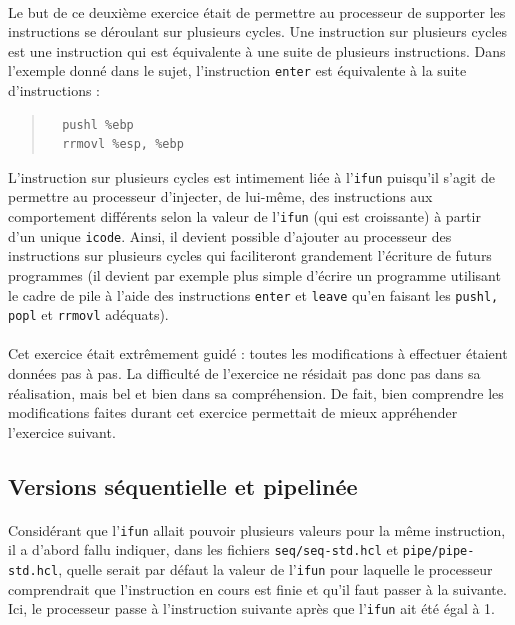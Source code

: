 \documentclass[12pt]{article}
\begin{document}
\paragraph{}Le but de ce deuxième exercice était de permettre au processeur de supporter les instructions se déroulant sur plusieurs cycles. Une instruction sur plusieurs cycles est une instruction qui est équivalente à une suite de plusieurs instructions. Dans l'exemple donné dans le sujet, l'instruction \verb+enter+ est équivalente à la suite d'instructions :
\begin{quote}
\begin{verbatim}
  pushl %ebp
  rrmovl %esp, %ebp
\end{verbatim}
\end{quote}
L'instruction sur plusieurs cycles est intimement liée à l'\verb+ifun+ puisqu'il s'agit de permettre au processeur d'injecter, de lui-même, des instructions aux comportement différents selon la valeur de l'\verb+ifun+ (qui est croissante) à partir d'un unique \verb+icode+. Ainsi, il devient possible d'ajouter au processeur des instructions sur plusieurs cycles qui faciliteront grandement l'écriture de futurs programmes (il devient par exemple plus simple d'écrire un programme utilisant le cadre de pile à l'aide des instructions \verb+enter+ et \verb+leave+ qu'en faisant les \verb+pushl, popl+ et \verb+rrmovl+ adéquats).

\paragraph{}Cet exercice était extrêmement guidé : toutes les modifications à effectuer étaient données pas à pas. La difficulté de l'exercice ne résidait pas donc pas dans sa réalisation, mais bel et bien dans sa compréhension. De fait, bien comprendre les modifications faites durant cet exercice permettait de mieux appréhender l'exercice suivant.

\subsection{Versions séquentielle et pipelinée}
\paragraph{}Considérant que l'\verb+ifun+ allait pouvoir plusieurs valeurs pour la même instruction, il a d'abord fallu indiquer, dans les fichiers \verb+seq/seq-std.hcl+ et \verb+pipe/pipe-std.hcl+, quelle serait par défaut la valeur de l'\verb+ifun+ pour laquelle le processeur comprendrait que l'instruction en cours est finie et qu'il faut passer à la suivante. Ici, le processeur passe à l'instruction suivante après que l'\verb+ifun+ ait été égal à 1.
\end{document}
